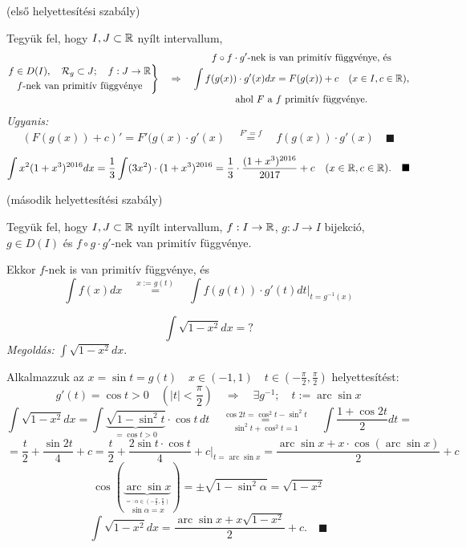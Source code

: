 \documentclass[a4paper,11.5pt]{article}
\DeclareMathOperator{\arc}{arc}
\begin{document}
	\begin{theorem}
		(első helyettesítési szabály)
		
		Tegyük fel, hogy $I,J\subset\mathbb{R}$ nyílt intervallum,
		\[ \left.\begin{gathered}
			f\in D(I),\quad \mathcal{R}_g\subset J;\quad f:J\to\mathbb{R} \\
			\text{$f$-nek van primitív függvénye}
		\end{gathered}\right\}\quad \Rightarrow\quad 
		\begin{gathered}
			f\circ f\cdot g'\text{-nek is van primitív függvénye, és}\\
			\int f(g(x))\cdot g'(x)dx=F(g(x))+c\quad (x\in I,c\in\mathbb{R}),\\
			\text{ahol $F$ a $f$ primitív függvénye.}
		\end{gathered} \]
		\textit{Ugyanis:} 
		\[ (F(g(x))+c)'=F'(g(x)\cdot g'(x)\quad \overset{F'=f}{=}\quad f(g(x))\cdot g'(x)\quad \blacksquare \]
	\end{theorem}
	\begin{example}
		\[ \int x^2(1+x^3)^{2016}dx=\frac{1}{3}\int (3x^2)\cdot(1+x^3)^{2016}=\frac{1}{3}\cdot\frac{(1+x^3)^{2016}}{2017}+c\quad (x\in\mathbb{R},c\in\mathbb{R}).\quad \blacksquare \]
	\end{example}
	\begin{theorem}
		(második helyettesítési szabály)
		
		Tegyük fel, hogy $I,J\subset\mathbb{R}$ nyílt intervallum, $f:I\to\mathbb{R}$, $g:J\to I$ bijekció, $g\in D(I)$ és $f\circ g\cdot g'$-nek van primitív függvénye.
		
		 Ekkor $f$-nek is van primitív függvénye, és
		 \[ \int f(x)dx\quad \overset{x:=g(t)}{=}\quad \int f(g(t))\cdot g'(t)dt\big|_{t=g^{-1}(x)} \]
	\end{theorem}
	\begin{example}
		\[ \int\sqrt{1-x^2} dx = ? \]
		\textit{Megoldás:} $\int \sqrt{1-x^2} dx.$
		
		Alkalmazzuk az $x=\sin t = g(t)\quad x\in(-1,1) \quad t\in\left(-\frac{\pi}{2},\frac{\pi}{2}\right)$ helyettesítést:
		\[ g'(t)=\cos t>0\quad \left(|t|<\frac{\pi}{2}\right)\quad \Rightarrow\quad \exists g^{-1}; \quad t:=\arc\sin x \]
		\[ \int \sqrt{1-x^2}dx=\int\underbrace{\sqrt{1-\sin^2t}}_{=\cos t>0}\cdot\cos t\, dt\quad \overset{\cos2t=\cos^2t-\sin^2t}{\underset{\sin^2t+\cos^2t=1}{=}}\quad \int \frac{1+\cos2t}{2}dt= \]
		\[ = \frac{t}{2}+\frac{\sin2t}{4} + c=\frac{t}{2}+\frac{2\sin t\cdot \cos t}{4}+c\big|_{t=\arc\sin x}=\frac{\arc\sin x + x\cdot\cos(\arc\sin x)}{2}+c \]
		\[\cos(\underbrace{\arc\sin x}_{\stackrel{=:\alpha\in\left(-\frac{\pi}{2},\frac{\pi}{2}\right)}{\sin\alpha=x}})=\pm\sqrt{1-\sin^2\alpha}=\sqrt{1-x^2}\]
		\[ \int\sqrt{1-x^2}dx=\frac{\arc\sin x+x\sqrt{1-x^2}}{2}+c.\quad \blacksquare \]
	\end{example}
\end{document}
